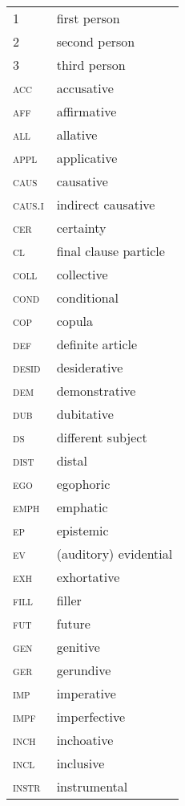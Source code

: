 


\begin{tabular}{ll} 
1         &    first person \\
2        &    second person \\
3        &    third person \\
\textsc{acc}       &   accusative \\
\textsc{aff}        &    affirmative \\
\textsc{all}       &    allative \\
\textsc{appl}       &    applicative \\
\textsc{caus}       &    causative \\
\textsc{caus.i}        &   indirect causative \\
\textsc{cer}       &    certainty \\
\textsc{cl}        &    final clause particle \\
\textsc{coll}        &    collective \\
\textsc{cond}      &    conditional \\
\textsc{cop}      &    copula \\
\textsc{def}       &    definite article \\
\textsc{desid}    &   desiderative \\
\textsc{dem}     &  demonstrative \\
\textsc{dub}    &  dubitative \\
\textsc{ds}     &  different subject \\
\textsc{dist} & distal\\
\textsc{ego}   &  egophoric \\
\textsc{emph} & emphatic \\
\textsc{ep}  &   epistemic \\
\textsc{ev}  &  (auditory) evidential \\
\textsc{exh}    &  exhortative \\
\textsc{fill}   &   filler \\
\textsc{fut}    &   future \\
\textsc{gen}   &   genitive \\
\textsc{ger}   &  gerundive \\
\textsc{imp}  &  imperative \\
\textsc{impf}   &  imperfective \\
\textsc{inch}   &   inchoative \\
\textsc{incl}    &   inclusive \\
\textsc{instr}     &  instrumental \\
\end{tabular}
